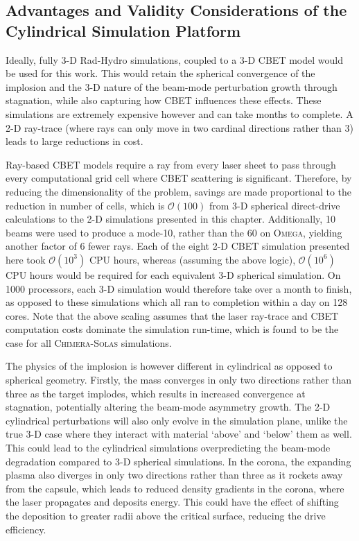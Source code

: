 \subsection{Advantages and Validity Considerations of the Cylindrical Simulation Platform}%
\label{sec:Res1_platformvalidity}

Ideally, fully 3-D \ac{Rad-Hydro} simulations, coupled to a 3-D \ac{CBET} model would be used for this work.
This would retain the spherical convergence of the implosion and the 3-D nature of the beam-mode perturbation growth through stagnation, while also capturing how \ac{CBET} influences these effects.
These simulations are extremely expensive however and can take months to complete.
A 2-D ray-trace (where rays can only move in two cardinal directions rather than 3) leads to large reductions in cost.

Ray-based \ac{CBET} models require a ray from every laser sheet to pass through every computational grid cell where \ac{CBET} scattering is significant.
Therefore, by reducing the dimensionality of the problem, savings are made proportional to the reduction in number of cells, which is $\mathcal{O}(100)$ from 3-D spherical direct-drive calculations to the 2-D simulations presented in this chapter.
Additionally, 10 beams were used to produce a mode-10, rather than the 60 on \textsc{Omega}, yielding another factor of 6 fewer rays.
Each of the eight 2-D \ac{CBET} simulation presented here took $\mathcal{O}\left(10^3\right)$ CPU hours, whereas (assuming the above logic), $\mathcal{O}\left(10^6\right)$ CPU hours would be required for each equivalent 3-D spherical simulation.
On 1000 processors, each 3-D simulation would therefore take over a month to finish, as opposed to these simulations which all ran to completion within a day on 128 cores.
Note that the above scaling assumes that the laser ray-trace and \ac{CBET} computation costs dominate the simulation run-time, which is found to be the case for all \textsc{Chimera}-\textsc{Solas} simulations.

The physics of the implosion is however different in cylindrical as opposed to spherical geometry.
Firstly, the mass converges in only two directions rather than three as the target implodes, which results in increased convergence at stagnation, potentially altering the beam-mode asymmetry growth.
The 2-D cylindrical perturbations will also only evolve in the simulation plane, unlike the true 3-D case where they interact with material `above' and `below' them as well.
This could lead to the cylindrical simulations overpredicting the beam-mode degradation compared to 3-D spherical simulations.
In the corona, the expanding plasma also diverges in only two directions rather than three as it rockets away from the capsule, which leads to reduced density gradients in the corona, where the laser propagates and deposits energy.
This could have the effect of shifting the deposition to greater radii above the critical surface, reducing the drive efficiency.

